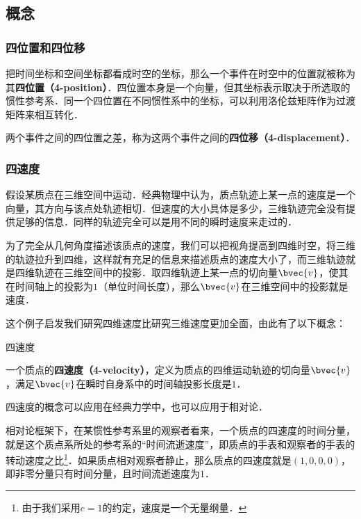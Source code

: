 
\subsection{概念}
\subsubsection{四位置和四位移}
把时间坐标和空间坐标都看成时空的坐标，那么一个事件在时空中的位置就被称为其\textbf{四位置（4-position）}．四位置本身是一个向量，但其坐标表示取决于所选取的惯性参考系．同一个四位置在不同惯性系中的坐标，可以利用洛伦兹矩阵作为过渡矩阵来相互转化．

两个事件之间的四位置之差，称为这两个事件之间的\textbf{四位移（4-displacement）}．

\subsubsection{四速度}

假设某质点在三维空间中运动．经典物理中认为，质点轨迹上某一点的速度是一个向量，其方向与该点处轨迹相切．但速度的大小具体是多少，三维轨迹完全没有提供足够的信息．同样的轨迹完全可以是用不同的瞬时速度来走过的．

为了完全从几何角度描述该质点的速度，我们可以把视角提高到四维时空，将三维的轨迹拉升到四维，这样就有充足的信息来描述质点的速度大小了，而三维轨迹就是四维轨迹在三维空间中的投影．取四维轨迹上某一点的切向量$\bvec{v}$，使其在时间轴上的投影为$1$（单位时间长度），那么$\bvec{v}$在三维空间中的投影就是速度．

这个例子启发我们研究四维速度比研究三维速度更加全面，由此有了以下概念：

\begin{definition}{四速度}

一个质点的\textbf{四速度（4-velocity）}，定义为质点的四维运动轨迹的切向量$\bvec{v}$，满足$\bvec{v}$在瞬时自身系中的时间轴投影长度是$1$． 

\end{definition}

四速度的概念可以应用在经典力学中，也可以应用于相对论．

相对论框架下，在某惯性参考系里的观察者看来，一个质点的四速度的时间分量，就是这个质点系所处的参考系的“时间流逝速度”，即质点的手表和观察者的手表的转动速度之比\footnote{由于我们采用$c=1$的约定，速度是一个无量纲量．}．如果质点相对观察者静止，那么质点的四速度就是$(1,0,0,0)$，即非零分量只有时间分量，且时间流逝速度为$1$．

